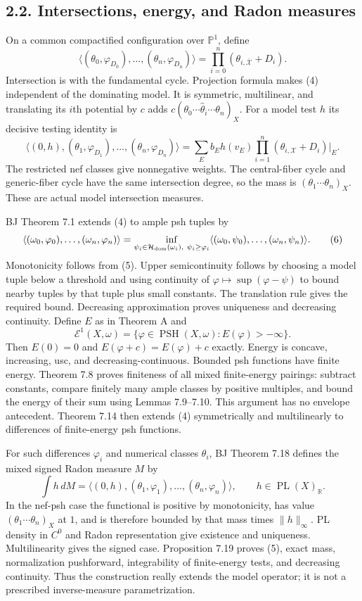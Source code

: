 \documentclass[
  11pt,
]{article}
\begin{document}
\subsection{2.2. Intersections, energy, and Radon
measures}\label{intersections-energy-and-radon-measures}

On a common compactified configuration over \(\mathbb P^1\), define \[
 \langle(\theta_0,\varphi_{D_0}),\ldots,(\theta_n,\varphi_{D_n})\rangle
 =\prod_{i=0}^n(\theta_{i,\overline{\mathcal X}}+D_i).
 \tag{4}
\] Intersection is with the fundamental cycle. Projection formula makes
(4) independent of the dominating model. It is symmetric, multilinear,
and translating its \(i\)th potential by \(c\) adds
\(c(\theta_0\cdots\widehat\theta_i\cdots\theta_n)_X\). For a model test
\(h\) its decisive testing identity is \[
 \langle(0,h),(\theta_1,\varphi_{D_1}),\ldots,(\theta_n,\varphi_{D_n})\rangle
 =\sum_E b_E h(v_E)\prod_{i=1}^n(\theta_{i,\mathcal X}+D_i)|_E.
 \tag{5}
\] The restricted nef classes give nonnegative weights. The
central-fiber cycle and generic-fiber cycle have the same intersection
degree, so the mass is \((\theta_1\cdots\theta_n)_X\). These are actual
model intersection measures.

BJ Theorem 7.1 extends (4) to ample psh tuples by \[
 \langle(\omega_0,\varphi_0),\ldots,(\omega_n,\varphi_n)\rangle
 =\inf_{\psi_i\in\mathcal H_{\rm dom}(\omega_i),\ \psi_i\geq\varphi_i}
       \langle(\omega_0,\psi_0),\ldots,(\omega_n,\psi_n)\rangle.
 \tag{6}
\] Monotonicity follows from (5). Upper semicontinuity follows by
choosing a model tuple below a threshold and using continuity of
\(\varphi\mapsto\sup(\varphi-\psi)\) to bound nearby tuples by that
tuple plus small constants. The translation rule gives the required
bound. Decreasing approximation proves uniqueness and decreasing
continuity. Define \(E\) as in Theorem A and
\[\mathcal E^1(X,\omega)=\{\varphi\in\operatorname{PSH}(X,\omega):E(\varphi)>-\infty\}.\]
Then \(E(0)=0\) and \(E(\varphi+c)=E(\varphi)+c\) exactly. Energy is
concave, increasing, usc, and decreasing-continuous. Bounded psh
functions have finite energy. Theorem 7.8 proves finiteness of all mixed
finite-energy pairings: subtract constants, compare finitely many ample
classes by positive multiples, and bound the energy of their sum using
Lemmas 7.9--7.10. This argument has no envelope antecedent. Theorem 7.14
then extends (4) symmetrically and multilinearly to differences of
finite-energy psh functions.

For such differences \(\varphi_i\) and numerical classes \(\theta_i\),
BJ Theorem 7.18 defines the mixed signed Radon measure \(M\) by \[
 \int h\,dM=\langle(0,h),(\theta_1,\varphi_1),\ldots,(\theta_n,\varphi_n)\rangle,
 \qquad h\in\operatorname{PL}(X)_{\mathbb R}.
 \tag{7}
\] In the nef-psh case the functional is positive by monotonicity, has
value \((\theta_1\cdots\theta_n)_X\) at \(1\), and is therefore bounded
by that mass times \(\|h\|_\infty\). PL density in \(C^0\) and Radon
representation give existence and uniqueness. Multilinearity gives the
signed case. Proposition 7.19 proves (5), exact mass, normalization
pushforward, integrability of finite-energy tests, and decreasing
continuity. Thus the construction really extends the model operator; it
is not a prescribed inverse-measure parametrization.
\end{document}
